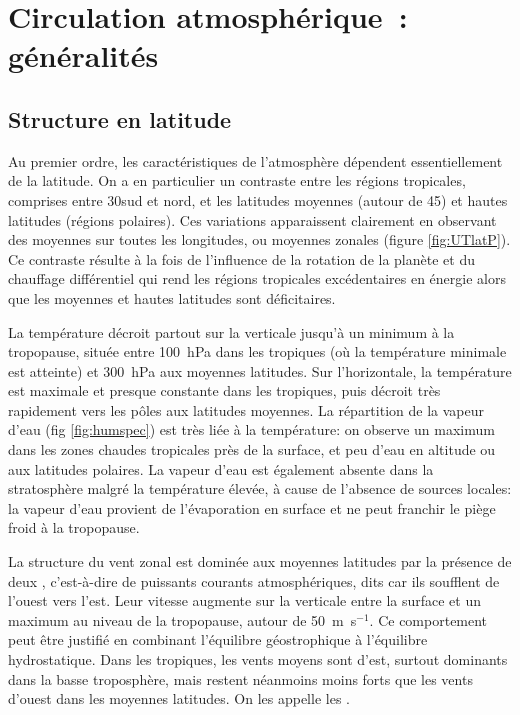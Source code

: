 \mk
\section{Circulation atmosphérique~: généralités}

\sk
\subsection{Structure en latitude}

\sk
Au premier ordre, les caractéristiques de l'atmosphère dépendent essentiellement de la latitude. On a en particulier un contraste entre les régions tropicales, comprises entre 30\deg sud et nord, et les latitudes moyennes (autour de 45\deg) et hautes latitudes (régions polaires). Ces variations apparaissent clairement en observant des moyennes sur toutes les longitudes, ou moyennes zonales (figure \ref{fig:UTlatP}). Ce contraste résulte à la fois de l'influence de la rotation de la planète et du chauffage différentiel qui rend les régions tropicales excédentaires en énergie alors que les moyennes et hautes latitudes sont déficitaires.


\sk
La température décroit partout sur la verticale jusqu'à un minimum à la tropopause, située entre 100~hPa dans les tropiques (où la température minimale est atteinte) et 300~hPa aux moyennes latitudes. Sur l'horizontale, la température est maximale et presque constante dans les tropiques, puis décroit très rapidement vers les pôles aux latitudes moyennes. La répartition de la vapeur d'eau (fig \ref{fig:humspec}) est très liée à la température: on observe un maximum dans les zones chaudes tropicales près de la surface, et peu d'eau en altitude ou aux latitudes polaires. La vapeur d'eau est également absente dans la stratosphère malgré la température élevée, à cause de l'absence de sources locales: la vapeur d'eau provient de l'évaporation en surface et ne peut franchir le piège froid à la tropopause.


\sk
La structure du vent zonal est dominée aux moyennes latitudes par la présence de deux , c'est-à-dire de puissants courants atmosphériques, dits  car ils soufflent de l'ouest vers l'est. Leur vitesse augmente sur la verticale entre la surface et un maximum au niveau de la tropopause, autour de 50~m~s$^{-1}$. Ce comportement peut être justifié en combinant l'équilibre géostrophique à l'équilibre hydrostatique. Dans les tropiques, les vents moyens sont d'est, surtout dominants dans la basse troposphère, mais restent néanmoins moins forts que les vents d'ouest dans les moyennes latitudes. On les appelle les .

